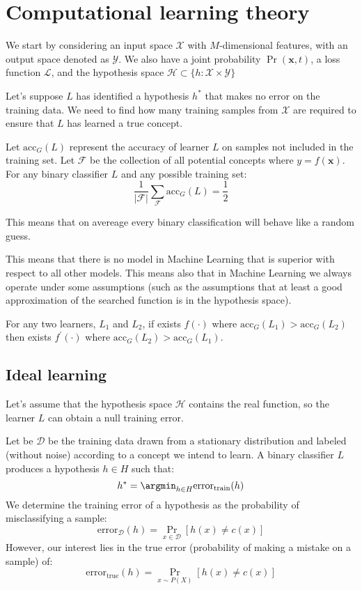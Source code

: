 \section{Computational learning theory}

We start by considering an input space $\mathcal{X}$ with $M$-dimensional features, with an output space denoted as $\mathcal{Y}$. 
We also have a joint probability $\Pr(\mathbf{x},t)$, a loss function $\mathcal{L}$, and the hypothesis space $\mathcal{H}\subset\{h:\mathcal{X}\times\mathcal{Y}\}$

Let's suppose $L$ has identified a hypothesis $h^\ast$ that makes no error on the training data. 
We need to find how many training samples from $\mathcal{X}$ are required to ensure that $L$ has learned a true concept. 
\begin{theorem}
    Let $\text{acc}_G(L)$ represent the accuracy of learner $L$ on samples not included in the training set.
    Let $\mathcal{F}$ be the collection of all potential concepts where $y=f(\mathbf{x})$.
    For any binary classifier $L$ and any possible training set:
    \[\dfrac{1}{\left\lvert \mathcal{F} \right\rvert}\sum_{\mathcal{F}}\text{acc}_G(L)=\dfrac{1}{2}\]
\end{theorem}
This means that on avereage every binary classification will behave like a random guess.

This means that there is no model in Machine Learning that is superior with respect to all other models. 
This means also that in Machine Learning we always operate under some assumptions (such as the assumptions that at least a good approximation of the searched function is in the hypothesis space). 
\begin{corollary}
    For any two learners, $L_1$ and $L_2$, if exists $f(\cdot)$ where $\text{acc}_G(L_1)>\text{acc}_G(L_2)$ then exists $f^\prime(\cdot)$ where $\text{acc}_G(L_2)>\text{acc}_G(L_1)$. 
\end{corollary}

\subsection{Ideal learning}
Let's assume that the hypothesis space $\mathcal{H}$ contains the real function, so the learner $L$ can obtain a null training error.

Let be $\mathcal{D}$ be the training data drawn from a stationary distribution and labeled (without noise) according to a concept we intend to learn.
A binary classifier $L$ produces a hypothesis $h \in H$ such that: 
\[h^\ast=\argmin_{h\in H}\text{error}_{\text{train}}(h)\]
We determine the training error of a hypothesis as the probability of misclassifying a sample:
\[\text{error}_{\mathcal{D}}(h)=\Pr_{x \in \mathcal{D}}\left[h(x)\neq c(x)\right]\]
However, our interest lies in the true error (probability of making a mistake on a sample) of:
\[\text{error}_{\text{true}}(h)=\Pr_{x \sim P(X)}\left[h(x)\neq c(x)\right]\]

